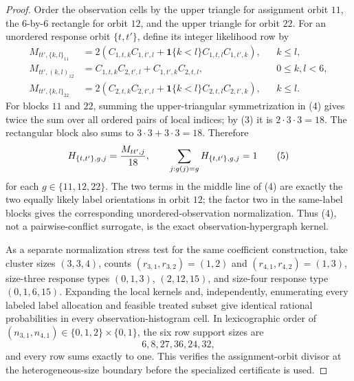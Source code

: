 \documentclass{article}
\begin{document}
\begin{proof}
Order the observation cells by the upper triangle for assignment orbit \(11\), the \(6\)-by-\(6\) rectangle for orbit \(12\), and the upper triangle for orbit \(22\).  For an unordered response orbit \(\{t,t'\}\), define its integer likelihood row by
\[
\begin{aligned}
M_{tt',\{k,l\}_{11}}
 &=2\left(C_{1,t,k}C_{1,t',l}
       +\mathbf 1\{k<l\}C_{1,t,l}C_{1,t',k}\right), && k\le l,\\
M_{tt',(k,l)_{12}}
 &=C_{1,t,k}C_{2,t',l}+C_{1,t',k}C_{2,t,l}, &&0\le k,l<6,\\
M_{tt',\{k,l\}_{22}}
 &=2\left(C_{2,t,k}C_{2,t',l}
       +\mathbf 1\{k<l\}C_{2,t,l}C_{2,t',k}\right), && k\le l.
\end{aligned}                                                               \tag{4}
\]
For blocks \(11\) and \(22\), summing the upper-triangular symmetrization in (4) gives twice the sum over all ordered pairs of local indices; by (3) it is \(2\cdot3\cdot3=18\).  The rectangular block also sums to \(3\cdot3+3\cdot3=18\).  Therefore
\[
H_{\{t,t'\},g,j}={M_{tt',j}\over18},
\qquad
\sum_{j:g(j)=g}H_{\{t,t'\},g,j}=1                                        \tag{5}
\]
for each \(g\in\{11,12,22\}\).  The two terms in the middle line of (4) are exactly the two equally likely label orientations in orbit \(12\); the factor two in the same-label blocks gives the corresponding unordered-observation normalization.  Thus (4), not a pairwise-conflict surrogate, is the exact observation-hypergraph kernel.

As a separate normalization stress test for the same coefficient construction, take cluster sizes \((3,3,4)\), counts \((r_{3,1},r_{3,2})=(1,2)\) and \((r_{4,1},r_{4,2})=(1,3)\), size-three response types \((0,1,3)\), \((2,12,15)\), and size-four response type \((0,1,6,15)\).  Expanding the local kernels and, independently, enumerating every labeled label allocation and feasible treated subset give identical rational probabilities in every observation-histogram cell.  In lexicographic order of \((n_{3,1},n_{4,1})\in\{0,1,2\}\times\{0,1\}\), the six row support sizes are
\[
6, 8, 27, 36, 24, 32,                                                  \tag{6}
\]
and every row sums exactly to one.  This verifies the assignment-orbit divisor at the heterogeneous-size boundary before the specialized certificate is used.


\end{proof}
\end{document}
